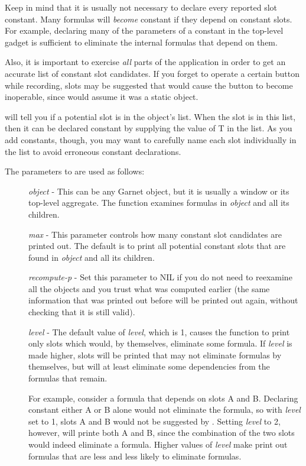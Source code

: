 Keep in mind that it is usually not necessary to declare every reported slot
constant.  Many formulas will {\it become} constant if they depend on constant
slots.  For example, declaring many of the parameters of a
 constant in the top-level gadget is sufficient
to eliminate the internal formulas that depend on them.

Also, it is important to exercise {\it all} parts of the application in order to
get an accurate list of constant slot candidates.  If you forget to operate
a certain button while recording, slots may be suggested that would cause the
button to become inoperable, since  would assume it
was a static object.

 will tell you if a potential slot is in the object's
 list.  When the slot is in this list, then it can be
declared constant by supplying the value of T in the  list.
As you add constants, though, you may want to carefully name each slot
individually in the  list to avoid erroneous constant
declarations.

The parameters to  are used as follows:

\begin{description}
\item[] {\it object} - This can be any Garnet object, but it is usually a window or its
top-level aggregate.  The function examines formulas in {\it object} and
all its children.

\item[] {\it max} - This parameter controls how many constant slot candidates are printed
out.  The default is to print all potential constant slots that are found
in {\it object} and all its children.

\item[] {\it recompute-p} - Set this parameter to NIL if you do not need to reexamine
all the objects and you trust what was computed earlier (the same information
that was printed out before will be printed out again, without checking that
it is still valid).


{\it level} - The default value of {\it level}, which is 1, causes the
function to print only slots which would, by themselves, eliminate
some formula.  If {\it level} is made higher, slots will be printed that may
not eliminate formulas by themselves, but will at least eliminate some
dependencies from the formulas that remain.

For example, consider a formula that depends on slots A and B.  Declaring
constant either A or B alone would not eliminate the formula, so with {\it level}
set to 1, slots A and B would not be suggested by .
Setting {\it level} to 2, however, will printe both A and B, since the
combination of the two slots would indeed eliminate a formula.  Higher
values of {\it level} make  print out formulas that are
less and less likely to eliminate formulas.

\end{description}


